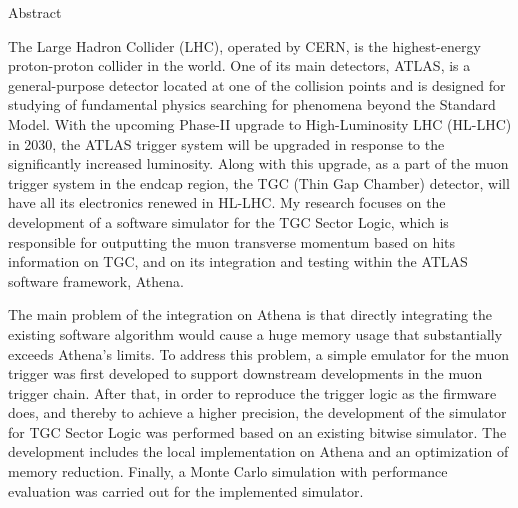 \begin{abstractpage}{Abstract}



    The Large Hadron Collider (LHC), operated by CERN, is the highest-energy proton-proton collider in the world. One of its main detectors, ATLAS, is a general-purpose detector located at one of the collision points and is designed for studying of fundamental physics searching for phenomena beyond the Standard Model. With the upcoming Phase-II upgrade to High-Luminosity LHC (HL-LHC) in 2030, the ATLAS trigger system will be upgraded in response to the significantly increased luminosity. Along with this upgrade, as a part of the muon trigger system in the endcap region, the TGC (Thin Gap Chamber) detector, will have all its electronics renewed in HL-LHC. My research focuses on the development of a software simulator for the TGC Sector Logic, which is responsible for outputting the muon transverse momentum based on hits information on TGC, and on its integration and testing within the ATLAS software framework, Athena.

    The main problem of the integration on Athena is that directly integrating the existing software algorithm would cause a huge memory usage that substantially exceeds Athena’s limits. To address this problem, a simple emulator for the muon trigger was first developed to support downstream developments in the muon trigger chain. After that, in order to reproduce the trigger logic as the firmware does, and thereby to achieve a higher precision, the development of the simulator for TGC Sector Logic was performed based on an existing bitwise simulator. The development includes the local implementation on Athena and an optimization of memory reduction. Finally, a Monte Carlo simulation with performance evaluation was carried out for the implemented simulator.

\end{abstractpage}
